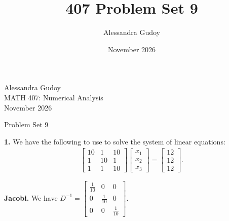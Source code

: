 \documentclass[12pt]{article}
\title{407 Problem Set 9}
\author{Alessandra Gudoy}
\date{November 2026}
\newcommand{\head}{
    \vspace*{-2cm} %
    \null \hfill Alessandra Gudoy \\ 
    \null \hfill MATH 407: Numerical Analysis \\
    \null \hfill November 2026
}
\newcommand{\q}[1]{\textbf{#1}}
\begin{document}
\head
\begin{center}
{\large Problem Set 9}
\end{center}

\q{1.} We have the following to use to solve the system of linear equations:
\begin{align*}
    \begin{bmatrix}
        10  & 1 & 10 \\
        1  & 10 & 1 \\
        1  & 1 & 10
    \end{bmatrix}
    \begin{bmatrix}
        x_1 \\
        x_2 \\
        x_3
    \end{bmatrix}
    =
    \begin{bmatrix}
        12 \\
        12 \\
        12
    \end{bmatrix}.
\end{align*}

\textbf{Jacobi.}
We have $
    D^{-1} = 
    \begin{bmatrix}
        \frac{1}{10}  & 0 & 0 \\[1.5ex]
        0  & \frac{1}{10} & 0 \\[1.5ex]
        0  & 0 & \frac{1}{10}
    \end{bmatrix}.
$
\end{document}
